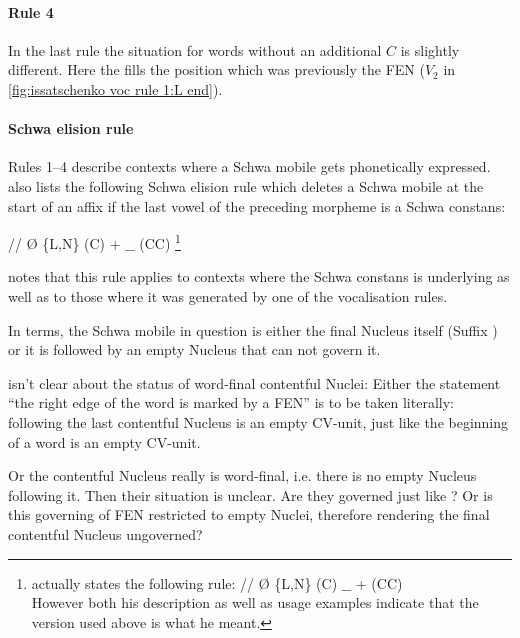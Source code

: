 \paragraph{Rule 4}
In the last rule the situation for words without an
additional $C$ is slightly different.
Here the \ti{/\textsce/} fills the position which
was previously the \gls{FEN} ($V_2$ in \cref{fig:issatschenko voc rule 1:L end}).

\paragraph{Schwa elision rule}
Rules 1--4 describe contexts where a Schwa mobile
gets phonetically expressed. \citeauthor{issatschenko1974}
also lists the following Schwa elision rule which deletes
a Schwa mobile at the start of an affix if the last
vowel of the preceding morpheme is a Schwa constans:

\deriv
  {/\schwaMobi/}    %
  {\O}              %
  {\schwaCons \{L,N\} (C) + $\_\_$ (CC)}%
\footnote{\cite{issatschenko1974} actually states the
  following rule:
  \deriv
    {/\schwaMobi/}    %
    {\O}              %
    {\schwaCons \{L,N\} (C) $\_\_$ + \schwaMobi (CC)}\\
  However both his description as well as usage examples
  indicate that the version used above is what he meant.
}

 notes that this rule
applies to contexts where the Schwa constans is underlying
as well as to those where it was generated by one of the
vocalisation rules.

In \CVCV terms, the Schwa mobile in question is either
the final Nucleus itself (Suffix ) or it is followed
by an empty Nucleus that can not govern it.

\Cite{scheer2004} isn't clear about the status of
word-final contentful Nuclei:
Either the statement \enquote{the right edge of the word is
  marked by a \acrlong{FEN}} is to be taken
  literally: following the last contentful Nucleus is
  an empty CV-unit, just like the beginning of a word is
  an empty CV-unit.

Or the contentful Nucleus really is word-final,
i.e. there is no empty Nucleus following it.
Then their situation is unclear.
Are they governed just like ?
Or is this governing of \gls{FEN} restricted to empty
Nuclei, therefore rendering the final contentful Nucleus
ungoverned?

